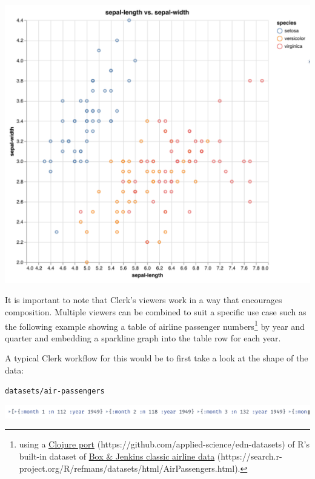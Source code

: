 \documentclass[sigconf,screen]{acmart}
\begin{document}
\includegraphics{images/anon-expr-5dtjeGHWCqJb9X8RfQtspB6Cyeo8Yv-result.png}

It is important to note that Clerk's viewers work in a way that encourages composition. Multiple viewers can be combined to suit a specific use case such as the following example showing a table of airline passenger numbers\footnote{using a {\href{https://github.com/applied-science/edn-datasets}{Clojure port} (https://github.com/applied-science/edn-datasets)} of R's built-in dataset of {\href{https://search.r-project.org/R/refmans/datasets/html/AirPassengers.html}{Box \& Jenkins classic airline data} (https://search.r-project.org/R/refmans/datasets/html/AirPassengers.html)}.} by year and quarter and embedding a sparkline graph into the table row for each year.

A typical Clerk workflow for this would be to first take a look at the shape of the data:

\begin{minipage}{\linewidth}
\begin{lstlisting}
datasets/air-passengers
\end{lstlisting}
\end{minipage}

\includegraphics{images/anon-expr-5drcDeJRcpX2uPqZi7XJch2DedHM6j-result.png}
\end{document}
